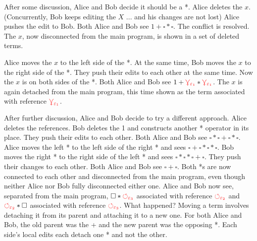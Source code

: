 \documentclass[nonacm, acmsmall, screen, review]{acmart}
\newcommand{\e}{\varepsilon}
\newcommand{\hole}{\ensuremath{\square}} %
\newcommand{\multiVertex}[1]{\textcolor{red}{\ensuremath{\curlyveedownarrow_{#1}}}}
\newcommand{\cycleVertex}[1]{\textcolor{red}{\ensuremath{\circlearrowleft_{#1}}}}
\begin{document}
After some discussion, Alice and Bob decide it should be a *.
Alice deletes the $x$.
(Concurrently, Bob keeps editing the $X$ ... and his changes are not lost)
Alice pushes the edit to Bob.
Both Alice and Bob see $1 + \hole * \hole$.
The conflict is resolved.
The $x$, now disconnected from the main program, is shown in a set of deleted terms.

Alice moves the $x$ to the left side of the *.
At the same time, Bob moves the $x$ to the right side of the *.
They push their edits to each other at the same time.
Now the $x$ is on both sides of the *.
Both Alice and Bob see $1 + \multiVertex{\e_1} * \multiVertex{\e_1}$.
The $x$ is again detached from the main program, this time shown as the term associated with reference $\multiVertex{\e_1}$.

After further discussion, Alice and Bob decide to try a different approach.
Alice deletes the references.
Bob deletes the 1 and constructs another * operator in its place.
They push their edits to each other.
Both Alice and Bob see $\hole * \hole + \hole * \hole$.
Alice moves the left * to the left side of the right * and sees $\hole + \hole * \hole * \hole$.
Bob moves the right * to the right side of the left * and sees $\hole * \hole * \hole + \hole$.
They push their changes to each other.
Both Alice and Bob see $\hole + \hole$.
Both *s are now connected to each other and disconnected from the main program, even though neither Alice nor Bob fully disconnected either one.
Alice and Bob now see, separated from the main program, $\hole * \cycleVertex{\e_3}$ associated with reference $\cycleVertex{\e_2}$ and $\cycleVertex{\e_2} * \hole$ associated with reference $\cycleVertex{\e_3}$.
What happened?
Moving a term involves detaching it from its parent and attaching it to a new one.
For both Alice and Bob, the old parent was the + and the new parent was the opposing *.
Each side's local edits each detach one * and not the other.

\end{document}
